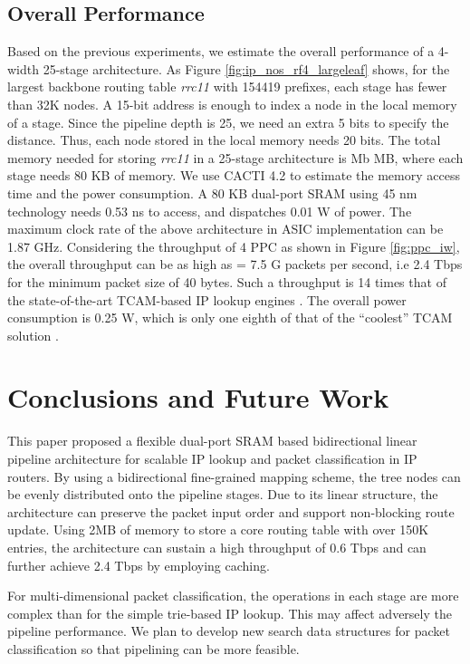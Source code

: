 \documentclass{sigcomm-alternate}
\begin{document}
\subsection{Overall Performance}

Based on the previous experiments, we estimate the overall performance of a 4-width 25-stage architecture. As Figure \ref{fig:ip_nos_rf4_largeleaf} shows, for the largest backbone routing table \textit{rrc11} with 154419 prefixes, each stage has fewer than 32K nodes. A 15-bit address is enough to index a node in the local memory of a stage. Since the pipeline depth is 25, we need an extra 5 bits to specify the distance. Thus, each node stored in the local memory needs 20 bits. The total memory needed for storing \textit{rrc11} in a 25-stage architecture is  Mb  MB, where each stage needs 80 KB of memory. We use CACTI 4.2\cite{cacti} to estimate the memory access time and the power consumption. A 80 KB dual-port SRAM using 45 nm technology needs 0.53 ns to access, and dispatches 0.01 W of power. The maximum clock rate of the above architecture in ASIC implementation can be 1.87 GHz. Considering the throughput of 4 PPC as shown in Figure \ref{fig:ppc_iw}, the overall throughput can be as high as  = 7.5 G packets per second, i.e 2.4 Tbps for the minimum packet size of 40 bytes. Such a throughput is 14 times that of the state-of-the-art TCAM-based IP lookup engines \cite{ton06:zheng}. The overall power consumption is 0.25 W, which is only one eighth of that of the ``coolest'' TCAM solution \cite{infocom03:zane}. 




\section{Conclusions and Future Work}
\label{sec:conclusion}

This paper proposed a flexible dual-port SRAM based bidirectional linear pipeline architecture for scalable IP lookup and packet classification in IP routers. By using a bidirectional fine-grained mapping scheme, the tree nodes can be evenly distributed onto the pipeline stages. Due to its linear structure, the architecture can preserve the packet input order and support non-blocking route update. Using 2MB of memory to store a core routing table with over 150K entries, the architecture can sustain a high throughput of 0.6 Tbps and can further achieve 2.4 Tbps by employing caching.

For multi-dimensional packet classification, the operations in each stage are more complex than for the simple trie-based IP lookup. This may affect adversely the pipeline performance. We plan to develop new search data structures for packet classification so that pipelining can be more feasible. 

  
\end{document}
